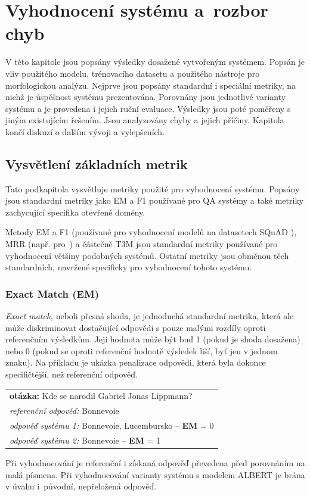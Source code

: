 
\chapter{Vyhodnocení systému a~rozbor chyb}
\label{system_evaluation}
V této kapitole jsou popsány výsledky dosažené vytvořeným systémem. Popsán je vliv použitého modelu, trénovacího datasetu a použitého nástroje pro morfologickou analýzu. Nejprve jsou popsány standardní i speciální metriky, na nichž je úspěšnost systému prezentována. Porovnány jsou jednotlivé varianty systému a je provedena i jejich ruční evaluace. Výsledky jsou poté poměřeny s jiným existujícím řešením. Jsou analyzovány chyby a jejich příčiny. Kapitola končí diskuzí o dalším vývoji a vylepšeních.


\section{Vysvětlení základních metrik}
\label{metriky}
Tato podkapitola vysvětluje metriky použité pro vyhodnocení systému. Popsány jsou standardní metriky jako EM a F1 používané pro QA systémy a také metriky zachycující specifika otevřené domény.\par
Metody EM a F1 (používané pro vyhodnocení modelů na datasetech SQuAD \cite{squad,squad_v2}), MRR (např. pro~\cite{sqad}) a částečně T3M jsou standardní metriky používané pro vyhodnocení většiny podobných systémů. Ostatní metriky jsou obměnou těch standardních, navržené specificky pro vyhodnocení tohoto systému.

\subsection{Exact Match (EM)}
\label{EM}
\emph{Exact match}, neboli přesná shoda, je jednoduchá standardní metrika, která ale může diskriminovat dostačující odpovědi s pouze malými rozdíly oproti referenčním výsledkům. Její hodnota může být buď 1 (pokud je shoda dosažena) nebo 0 (pokud se oproti referenční hodnotě výsledek liší, byť jen v jednom znaku). Na příkladu je ukázka penalizace odpovědi, která byla dokonce specifičtější, než referenční odpověď.\par
\begin{center}
\begin{tabular}{l}
    \textbf{otázka:} Kde se narodil Gabriel Jonas Lippmann?\\
    \emph{referenční odpověď:} Bonnevoie\\
    \emph{odpověď systému 1:} Bonnevoie, Lucembursko -- \textbf{EM} = 0\\
    \emph{odpověď systému 2:} Bonnevoie -- \textbf{EM} = 1
\end{tabular}
\end{center}
Při vyhodnocování je referenční i získaná odpověď převedena před porovnáním na malá písmena. Při vyhodnocování varianty systému s modelem ALBERT je brána v úvahu i~původní, nepřeložená odpověď.

